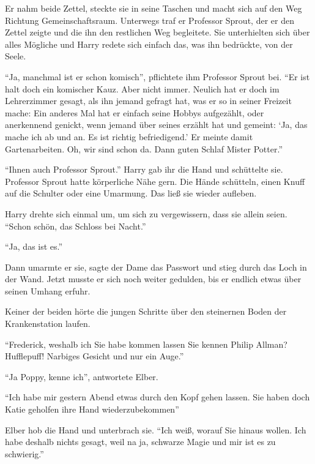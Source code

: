 Er nahm beide Zettel, steckte sie in seine Taschen und macht sich auf den Weg Richtung Gemeinschaftsraum. Unterwegs traf er Professor Sprout, der er den Zettel zeigte und die ihn den restlichen Weg begleitete. Sie unterhielten sich über alles Mögliche und Harry redete sich einfach das, was ihn bedrückte, von der Seele.

\enquote{Ja, manchmal ist er schon komisch}, pflichtete ihm Professor Sprout bei. \enquote{Er ist halt doch ein komischer Kauz. Aber nicht immer. Neulich hat er doch im Lehrerzimmer gesagt, als ihn jemand gefragt hat, was er so in seiner Freizeit mache:  Ein anderes Mal hat er einfach seine Hobbys aufgezählt, oder anerkennend genickt, wenn jemand über seines erzählt hat und gemeint: \enquote{Ja, das mache ich ab und an. Es ist richtig befriedigend.} Er meinte damit Gartenarbeiten. \gst Oh, wir sind schon da. Dann guten Schlaf Mister Potter.}

\enquote{Ihnen auch Professor Sprout.} Harry gab ihr die Hand und schüttelte sie. Professor Sprout hatte körperliche Nähe gern. Die Hände schütteln, einen Knuff auf die Schulter oder eine Umarmung. Das ließ sie wieder aufleben.

Harry drehte sich einmal um, um sich zu vergewissern, dass sie allein seien. \enquote{Schon schön, das Schloss bei Nacht.}

\enquote{Ja, das ist es.}

Dann umarmte er sie, sagte der Dame das Passwort und stieg durch das Loch in der Wand. Jetzt musste er sich noch weiter gedulden, bis er endlich etwas über seinen Umhang erfuhr.

\trenn

Keiner der beiden hörte die jungen Schritte über den steinernen Boden der Krankenstation laufen.

\enquote{Frederick, weshalb ich Sie habe kommen lassen \gst Sie kennen Philip Allman? Hufflepuff! Narbiges Gesicht und nur ein Auge.}

\enquote{Ja Poppy, kenne ich}, antwortete Elber.

\enquote{Ich habe mir gestern Abend etwas durch den Kopf gehen lassen. Sie haben doch Katie geholfen ihre Hand wiederzubekommen\abs}

Elber hob die Hand und unterbrach sie. \enquote{Ich weiß, worauf Sie hinaus wollen. Ich habe deshalb nichts gesagt, weil \gst na ja, schwarze Magie \gst und mir ist es zu schwierig.}

